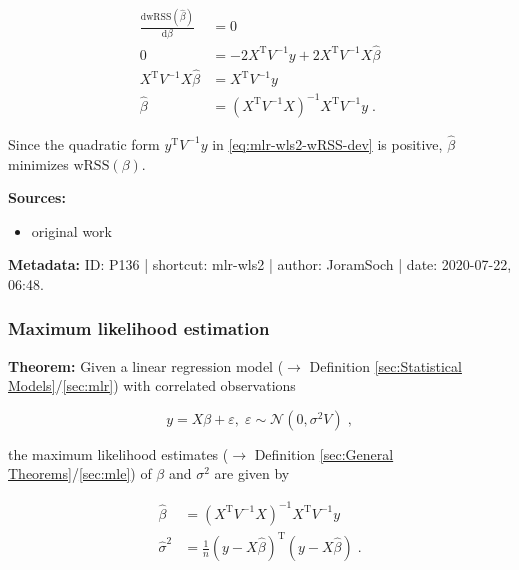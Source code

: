 \documentclass[a4paper,12pt,twoside]{book}
\begin{document}
\begin{equation} \label{eq:mlr-wls2-WLS-qed}
\begin{split}
\frac{\mathrm{d}\mathrm{wRSS}(\hat{\beta})}{\mathrm{d}\beta} &= 0 \\
0 &= - 2 X^\mathrm{T} V^{-1} y + 2 X^\mathrm{T} V^{-1} X \hat{\beta} \\
X^\mathrm{T} V^{-1} X \hat{\beta} &= X^\mathrm{T} V^{-1} y \\
\hat{\beta} &= (X^\mathrm{T} V^{-1} X)^{-1} X^\mathrm{T} V^{-1} y \; .
\end{split}
\end{equation}

Since the quadratic form $y^\mathrm{T} V^{-1} y$ in \eqref{eq:mlr-wls2-wRSS-dev} is positive, $\hat{\beta}$ minimizes $\mathrm{wRSS}(\beta)$.


\vspace{1em}
\textbf{Sources:}
\begin{itemize}
\item original work\end{itemize}


\vspace{1em}
\textbf{Metadata:} ID: P136 | shortcut: mlr-wls2 | author: JoramSoch | date: 2020-07-22, 06:48.
\vspace{1em}



\subsubsection[\textbf{Maximum likelihood estimation}]{Maximum likelihood estimation} \label{sec:mlr-mle}
\setcounter{equation}{0}

\textbf{Theorem:} Given a linear regression model ($\rightarrow$ Definition \ref{sec:Statistical Models}/\ref{sec:mlr}) with correlated observations

\begin{equation} \label{eq:mlr-mle-MLR}
y = X\beta + \varepsilon, \; \varepsilon \sim \mathcal{N}(0, \sigma^2 V) \; ,
\end{equation}

the maximum likelihood estimates ($\rightarrow$ Definition \ref{sec:General Theorems}/\ref{sec:mle}) of $\beta$ and $\sigma^2$ are given  by

\begin{equation} \label{eq:mlr-mle-MLE-MLE}
\begin{split}
\hat{\beta} &= (X^\mathrm{T} V^{-1} X)^{-1} X^\mathrm{T} V^{-1} y \\
\hat{\sigma}^2 &= \frac{1}{n} (y-X\hat{\beta})^\mathrm{T} (y-X\hat{\beta}) \; .
\end{split}
\end{equation}
\end{document}
